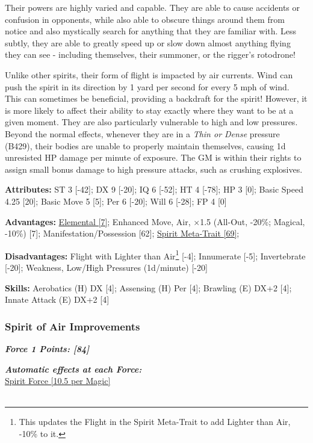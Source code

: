 \begin{multicols*}{3}
	Their powers are highly varied and capable. They are able to cause accidents or confusion in opponents, while also able to obscure things around them from notice and also mystically search for anything that they are familiar with. Less subtly, they are able to greatly speed up or slow down almost anything flying they can see - including themselves, their summoner, or the rigger's rotodrone!
	
	Unlike other spirits, their form of flight is impacted by air currents. Wind can push the spirit in its direction by 1 yard per second for every 5 mph of wind. This can sometimes be beneficial, providing a backdraft for the spirit! However, it is more likely to affect their ability to stay exactly where they want to be at a given moment. They are also particularly vulnerable to high and low pressures. Beyond the normal effects, whenever they are in a \textit{Thin or Dense} pressure (B429), their bodies are unable to properly maintain themselves, causing 1d unresisted HP damage per minute of exposure. The GM is within their rights to assign small bonus damage to high pressure attacks, such as crushing explosives.
	
	\textbf{Attributes:}
	ST 3 [-42]; DX 9 [-20]; IQ 6 [-52]; HT 4 [-78]; HP 3 [0]; Basic Speed 4.25 [20]; Basic Move 5 [5]; Per 6 [-20]; Will 6 [-28]; FP 4 [0]
	
	\textbf{Advantages:}
	\hyperref[elemental]{Elemental [7]}; Enhanced Move, Air, \(\times\)1.5 (All-Out, -20\%; Magical, -10\%) [7]; Manifestation/Possession [62]; \hyperref[spirit_meta_trait]{Spirit Meta-Trait [69]}; 
	
	\textbf{Disadvantages:}
	Flight with Lighter than Air\footnote{This updates the Flight in the Spirit Meta-Trait to add Lighter than Air, -10\% to it.} [-4]; Innumerate [-5]; Invertebrate [-20]; Weakness, Low/High Pressures (1d/minute) [-20]
	
	\textbf{Skills:}
	Aerobatics (H) DX [4]; Assensing (H) Per [4]; Brawling (E) DX+2 [4]; Innate Attack (E) DX+2 [4]
	
	\subsubsection*{Spirit of Air Improvements}
	
	\textbf{\textit{Force 1 Points: [84]}}
	
	\textbf{\textit{Automatic effects at each Force:\\}}
	\hyperref[spirit_force]{Spirit Force [10.5 per Magic]}\\\\
	

\end{multicols*}

